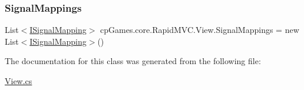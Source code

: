 \mbox{\label{classcp_games_1_1core_1_1_rapid_m_v_c_1_1_view_a70d45752cc44bbac2011ea458ee01230}} 
\subsubsection{\texorpdfstring{SignalMappings}{SignalMappings}}
{\footnotesize\ttfamily List$<$\mbox{\hyperlink{interfacecp_games_1_1core_1_1_rapid_m_v_c_1_1impl_1_1_i_signal_mapping}{I\+Signal\+Mapping}}$>$ cp\+Games.\+core.\+Rapid\+M\+V\+C.\+View.\+Signal\+Mappings = new List$<$\mbox{\hyperlink{interfacecp_games_1_1core_1_1_rapid_m_v_c_1_1impl_1_1_i_signal_mapping}{I\+Signal\+Mapping}}$>$()\hspace{0.3cm}{\ttfamily [get]}}



The documentation for this class was generated from the following file\+:\begin{DoxyCompactItemize}
\item 
\mbox{\hyperlink{_view_8cs}{View.\+cs}}\end{DoxyCompactItemize}
